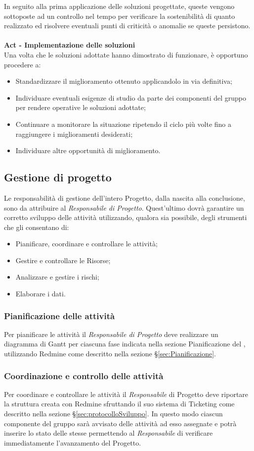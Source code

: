 In seguito alla prima applicazione delle soluzioni progettate, queste vengono sottoposte ad un controllo nel tempo per verificare la sostenibilità di quanto realizzato ed risolvere eventuali punti di criticità o anomalie se queste persistono.\\\\
\textbf{Act - Implementazione delle soluzioni}\\
Una volta che le soluzioni adottate hanno dimostrato di funzionare, è opportuno procedere a:
\begin{itemize}
\item Standardizzare il miglioramento ottenuto applicandolo in via definitiva;
\item Individuare eventuali esigenze di studio da parte dei componenti del gruppo per rendere operative le soluzioni adottate;
\item Continuare a monitorare la situazione ripetendo il ciclo più volte fino a raggiungere i miglioramenti desiderati;
\item Individuare altre opportunità di miglioramento.
\end{itemize}
\subsection{Gestione di progetto}
Le responsabilità di gestione dell’intero Progetto, dalla nascita alla conclusione, sono da
attribuire al \emph{Responsabile di Progetto}.
Quest’ultimo dovrà garantire un corretto sviluppo delle attività utilizzando, qualora sia possibile, degli strumenti che gli consentano di:
\begin{itemize}
\item Pianificare, coordinare e controllare le attività;
\item Gestire e controllare le Risorse;
\item Analizzare e gestire i rischi;
\item Elaborare i dati.
\end{itemize}
\subsubsection{Pianificazione delle attività}
Per pianificare le attività il \emph{Responsabile di Progetto} deve realizzare un diagramma di
Gantt  per ciascuna fase indicata nella sezione Pianificazione del \href{run:../../Esterni/\fPianoDiProgetto}{\fEscapePianoDiProgetto} , utilizzando Redmine come descritto nella sezione \S\ref{sec:Pianificazione}.
\subsubsection{Coordinazione e controllo delle attività}
Per coordinare e controllare le attività il \emph{Responsabile} di Progetto deve riportare la struttura creata con Redmine sfruttando il suo sistema di Ticketing
come descritto nella sezione \S\ref{sec:protocolloSviluppo}.
In questo modo ciascun componente del gruppo sarà avvisato delle attività ad esso assegnate e potrà inserire lo stato delle stesse permettendo al \emph{Responsabile} di verificare immediatamente l’avanzamento del Progetto.

